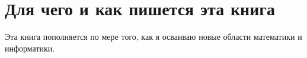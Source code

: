 \chapter{Для чего и как пишется эта книга}

Эта книга пополняется по мере того, как я осваиваю новые области математики и информатики.
